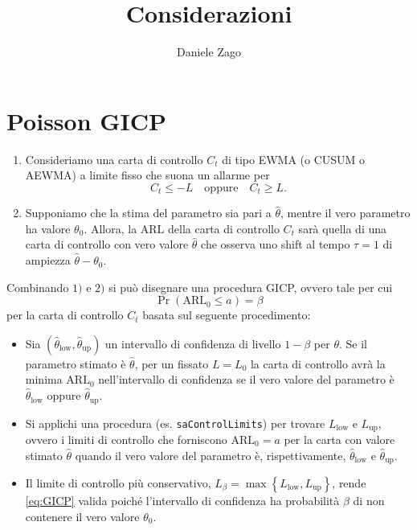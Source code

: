\documentclass{article}
\author{Daniele Zago}
\title{Considerazioni}
\date{}
\begin{document}
\maketitle

\section{Poisson GICP}\label{sec:Poisson GICP}
\begin{enumerate}[label=\arabic*)]
    \item  Consideriamo una carta di controllo $ C_{t}$ di tipo EWMA (o CUSUM o AEWMA) a limite fisso che suona un allarme per
        \[
          C_{t} \le -L \quad \text{oppure} \quad C_{t} \ge L.
        \]

    \item Supponiamo che la stima del parametro sia pari a $ \widehat{\theta}$, mentre il vero parametro ha valore $ \theta_0$.
        Allora, la ARL della carta di controllo $ C_{t}$ sarà quella di una carta di controllo con vero valore $ \widehat{\theta}$ che osserva uno shift al tempo $ \tau = 1$ di ampiezza $ \widehat{\theta} - \theta_0$.
\end{enumerate}

Combinando $ 1)$ e $ 2)$ si può disegnare una procedura GICP, ovvero tale per cui
\begin{equation}
    \label{eq:GICP}
    \Pr(\text{ARL}_0 \le a) = \beta
\end{equation}
per la carta di controllo $ C_{t}$ basata sul seguente procedimento:
\begin{itemize}
    \item Sia $(\widehat{\theta}_\text{low}, \widehat{\theta}_\text{up})$ un intervallo di confidenza di livello $ 1 - \beta$ per $ \theta$.
        Se il parametro stimato è $ \widehat{\theta}$, per un fissato $ L = L_0$ la carta di controllo avrà la minima $ \text{ARL}_0$ nell'intervallo di confidenza se il vero valore del parametro è $ \widehat{\theta}_\text{low}$ oppure $ \widehat{\theta}_\text{up}$.

    \item Si applichi una procedura (es. \texttt{saControlLimits}) per trovare $ L_\text{low}$ e $ L_\text{up}$, ovvero i limiti di controllo che forniscono $ \text{ARL}_0 = a$ per la carta con valore stimato $ \widehat{\theta}$ quando il vero valore del parametro è, rispettivamente, $ \widehat{\theta}_\text{low}$ e $ \widehat{\theta}_\text{up}$.

    \item Il limite di controllo più conservativo, $ L_{\beta} = \max\left\{ L_\text{low}, L_\text{up} \right\}$, rende \eqref{eq:GICP} valida poiché l'intervallo di confidenza ha probabilità $ \beta$ di non contenere il vero valore $ \theta_0$.
\end{itemize}
\end{document}
